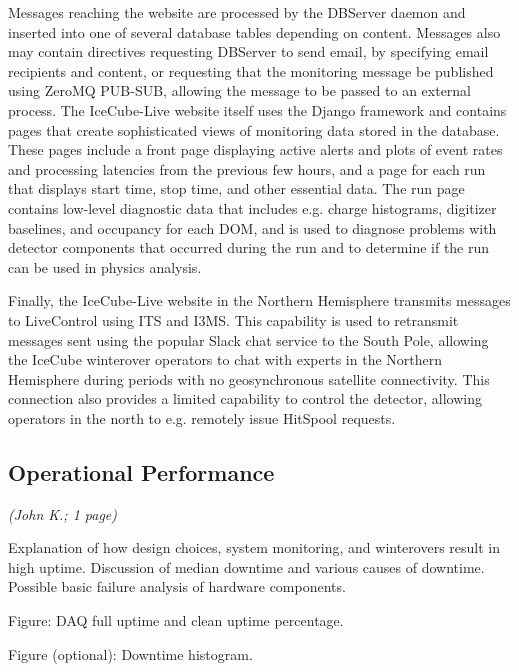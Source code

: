 Messages reaching the website are processed by the DBServer daemon and inserted into one of several database tables depending on content.
Messages also may contain directives requesting DBServer to send email, by specifying email recipients and content,
or requesting that the monitoring message be published using ZeroMQ PUB-SUB, allowing the message to be passed to an external process.  The IceCube-Live
website itself uses the Django framework and contains pages that create sophisticated views of monitoring data stored in the database.
These pages include a front page displaying active alerts and plots of event rates and processing latencies from the previous few hours, and
a page for each run that displays start time, stop time, and other essential data.  The run page contains low-level diagnostic data that
includes e.g. charge histograms, digitizer baselines, and occupancy for each DOM, and is used to diagnose problems with detector components
that occurred during the run and to determine if the run can be used in physics analysis.

Finally, the IceCube-Live website in the Northern Hemisphere transmits messages to LiveControl using ITS and I3MS.  This capability is used to retransmit
messages sent using the popular Slack chat service to the South Pole, allowing the IceCube winterover operators to chat with
experts in the Northern Hemisphere during periods with no geosynchronous satellite connectivity.  This connection also provides a limited
capability to control the detector, allowing operators in the north to e.g. remotely issue HitSpool requests.

\subsection{Operational Performance}
\textsl{(John K.; 1 page)}

Explanation of how design choices, system monitoring, and winterovers result in
high uptime.  Discussion of median downtime and various causes of downtime.
Possible basic failure analysis of hardware components.

Figure: DAQ full uptime and clean uptime percentage.

Figure (optional): Downtime histogram.
